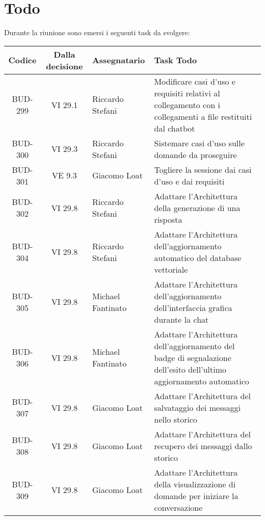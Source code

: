 
\section{Todo}

Durante la riunione sono emersi i seguenti task da svolgere:

\vspace{0.5cm}

\begin{table}[htbp]
\centering
{}
\begin{tabular}{|c|c|p{}|p{}|}
    \hline
    \rowcolor[gray]{0.75}
    \textbf{Codice} & \textbf{Dalla decisione} & \textbf{Assegnatario} & \textbf{Task Todo} \\
    \hline
    BUD-299 & VI 29.1 & Riccardo Stefani & Modificare casi d'uso e requisiti relativi al collegamento con i collegamenti a file restituiti dal chatbot\\
    \hline
    BUD-300 & VI 29.3 & Riccardo Stefani & Sistemare casi d'uso sulle domande da proseguire\\
    \hline
    BUD-301 & VE 9.3 & Giacomo Loat & Togliere la sessione dai casi d'uso e dai requisiti\\
    \hline
    BUD-302 & VI 29.8 & Riccardo Stefani & Adattare l'Architettura della generazione di una risposta\\
    \hline
    BUD-304 & VI 29.8 & Riccardo Stefani & Adattare l'Architettura dell’aggiornamento automatico del database vettoriale\\
    \hline
    BUD-305 & VI 29.8 & Michael Fantinato & Adattare l'Architettura dell’aggiornamento dell’interfaccia grafica durante la chat \\
    \hline
    BUD-306 & VI 29.8 & Michael Fantinato & Adattare l'Architettura dell’aggiornamento del badge di segnalazione dell’esito dell’ultimo aggiornamento automatico\\
    \hline
    BUD-307 & VI 29.8 & Giacomo Loat & Adattare l'Architettura del salvataggio dei messaggi nello storico\\
    \hline
    BUD-308 & VI 29.8 & Giacomo Loat & Adattare l'Architettura del recupero dei messaggi dallo storico\\
    \hline
    BUD-309 & VI 29.8 & Giacomo Loat & Adattare l'Architettura della visualizzazione di domande per iniziare la conversazione\\

\end{tabular}
\end{table}
